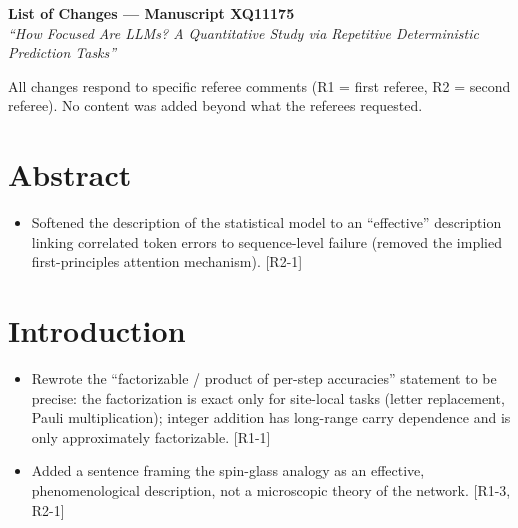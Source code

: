 \documentclass[11pt]{article}
\newcommand{\rf}[1]{\hfill\textnormal{\small[#1]}}
\begin{document}
\begin{center}
{\Large\bfseries List of Changes --- Manuscript XQ11175}\\[4pt]
\textit{``How Focused Are LLMs? A Quantitative Study via Repetitive Deterministic Prediction Tasks''}
\end{center}

\medskip

All changes respond to specific referee comments (R1 = first referee, R2 = second referee). No
content was added beyond what the referees requested.

\section{Abstract}
\begin{itemize}
  \item Softened the description of the statistical model to an ``effective'' description linking
        correlated token errors to sequence-level failure (removed the implied first-principles
        attention mechanism). \rf{R2-1}
\end{itemize}

\section{Introduction}
\begin{itemize}
  \item Rewrote the ``factorizable / product of per-step accuracies'' statement to be precise:
        the factorization is exact only for site-local tasks (letter replacement, Pauli
        multiplication); integer addition has long-range carry dependence and is only
        approximately factorizable. \rf{R1-1}
  \item Added a sentence framing the spin-glass analogy as an effective, phenomenological
        description, not a microscopic theory of the network. \rf{R1-3, R2-1}
\end{itemize}
\end{document}
